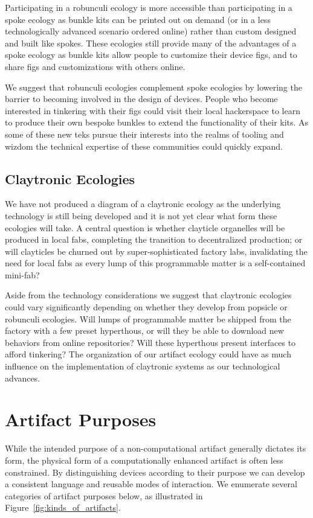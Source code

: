 Participating in a robunculi ecology is more accessible than participating in a spoke ecology as bunkle kits can be printed out on demand (or in a less technologically advanced scenario ordered online) rather than custom designed and built like spokes. These ecologies still provide many of the advantages of a spoke ecology as bunkle kits allow people to customize their device figs, and to share figs and customizations with others online.

We suggest that robunculi ecologies complement spoke ecologies by lowering the barrier to becoming involved in the design of devices. 
People who become interested in tinkering with their figs could visit their local hackerspace to learn to produce their own bespoke bunkles to extend the functionality of their kits.
As some of these new teks pursue their interests into the realms of tooling and wizdom the technical expertise of these communities could quickly expand.

\subsection{Claytronic Ecologies}    
%
We have not produced a diagram of a claytronic ecology as the underlying technology is still being developed and it is not yet clear what form these ecologies will take. 
A central question is whether clayticle organelles will be produced in local fabs, completing the transition to decentralized production; or will clayticles be churned out by super{}-sophisticated factory labs, invalidating the need for local fabs as every lump of this programmable matter is a self{}-contained mini{}-fab?

Aside from the technology considerations we suggest that claytronic ecologies could vary significantly depending on whether they develop from popsicle or robunculi ecologies. Will lumps of programmable matter be shipped from the factory with a few preset hyperthous, or will they be able to download new behaviors from online repositories? Will these hyperthous present interfaces to afford tinkering? The organization of our artifact ecology could have as much influence on the implementation of claytronic systems as our technological advances.

\section{Artifact Purposes}
\label{sec:purposes}
%
While the intended purpose of a non{}-computational artifact generally dictates its form, the physical form of a computationally enhanced artifact is often less constrained. 
By distinguishing devices according to their purpose we can develop a consistent language and reusable modes of interaction. 
We enumerate several categories of artifact purposes below, as illustrated in Figure~\ref{fig:kinds_of_artifacts}. 

